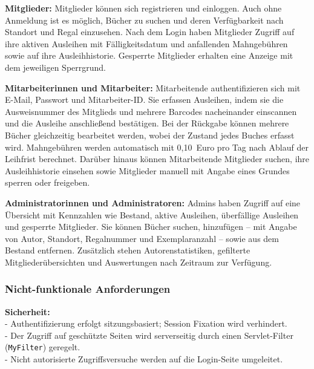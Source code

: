 \textbf{Mitglieder:}
Mitglieder können sich registrieren und einloggen. Auch ohne Anmeldung ist es möglich, 
Bücher zu suchen und deren Verfügbarkeit nach Standort und Regal einzusehen. 
Nach dem Login haben Mitglieder Zugriff auf ihre aktiven Ausleihen mit Fälligkeitsdatum 
und anfallenden Mahngebühren sowie auf ihre Ausleihhistorie. 
Gesperrte Mitglieder erhalten eine Anzeige mit dem jeweiligen Sperrgrund.

\vspace{-10pt}

\textbf{Mitarbeiterinnen und Mitarbeiter:}
Mitarbeitende authentifizieren sich mit E-Mail, Passwort und Mitarbeiter-ID. 
Sie erfassen Ausleihen, indem sie die Ausweisnummer des Mitglieds und mehrere 
Barcodes nacheinander einscannen und die Ausleihe anschließend bestätigen. 
Bei der Rückgabe können mehrere Bücher gleichzeitig bearbeitet werden, 
wobei der Zustand jedes Buches erfasst wird. Mahngebühren werden automatisch 
mit 0{,}10~Euro pro Tag nach Ablauf der Leihfrist berechnet. 
Darüber hinaus können Mitarbeitende Mitglieder suchen, ihre Ausleihhistorie einsehen 
sowie Mitglieder manuell mit Angabe eines Grundes sperren oder freigeben.

\vspace{-10pt}

\textbf{Administratorinnen und Administratoren:}
Admins haben Zugriff auf eine Übersicht mit Kennzahlen wie Bestand, aktive Ausleihen, 
überfällige Ausleihen und gesperrte Mitglieder. Sie können Bücher suchen, 
hinzufügen -- mit Angabe von Autor, Standort, Regalnummer und Exemplaranzahl -- 
sowie aus dem Bestand entfernen. Zusätzlich stehen Autorenstatistiken, 
gefilterte Mitgliederübersichten und Auswertungen nach Zeitraum zur Verfügung.

\vspace{-10pt}


\vspace{-20pt}
\subsubsection{Nicht-funktionale Anforderungen}

    \vspace{-10pt}

\textbf{Sicherheit:}
    \\- Authentifizierung erfolgt sitzungsbasiert; Session Fixation wird verhindert.
    \\- Der Zugriff auf geschützte Seiten wird serverseitig durch einen Servlet-Filter (\texttt{MyFilter}) geregelt.
    \\- Nicht autorisierte Zugriffsversuche werden auf die Login-Seite umgeleitet.

